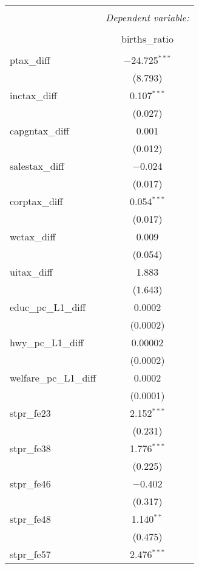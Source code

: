 
\begin{table}[!htbp] \centering 
  \caption{} 
  \label{} 
\begin{tabular}{@{\extracolsep{5pt}}lc} 
\\[-1.8ex]\hline 
\hline \\[-1.8ex] 
 & \multicolumn{1}{c}{\textit{Dependent variable:}} \\ 
\cline{2-2} 
\\[-1.8ex] & births\_ratio \\ 
\hline \\[-1.8ex] 
 ptax\_diff & $-$24.725$^{***}$ \\ 
  & (8.793) \\ 
  inctax\_diff & 0.107$^{***}$ \\ 
  & (0.027) \\ 
  capgntax\_diff & 0.001 \\ 
  & (0.012) \\ 
  salestax\_diff & $-$0.024 \\ 
  & (0.017) \\ 
  corptax\_diff & 0.054$^{***}$ \\ 
  & (0.017) \\ 
  wctax\_diff & 0.009 \\ 
  & (0.054) \\ 
  uitax\_diff & 1.883 \\ 
  & (1.643) \\ 
  educ\_pc\_L1\_diff & 0.0002 \\ 
  & (0.0002) \\ 
  hwy\_pc\_L1\_diff & 0.00002 \\ 
  & (0.0002) \\ 
  welfare\_pc\_L1\_diff & 0.0002 \\ 
  & (0.0001) \\ 
  stpr\_fe23 & 2.152$^{***}$ \\ 
  & (0.231) \\ 
  stpr\_fe38 & 1.776$^{***}$ \\ 
  & (0.225) \\ 
  stpr\_fe46 & $-$0.402 \\ 
  & (0.317) \\ 
  stpr\_fe48 & 1.140$^{**}$ \\ 
  & (0.475) \\ 
  stpr\_fe57 & 2.476$^{***}$ \\ 

\end{tabular}
\end{table}

